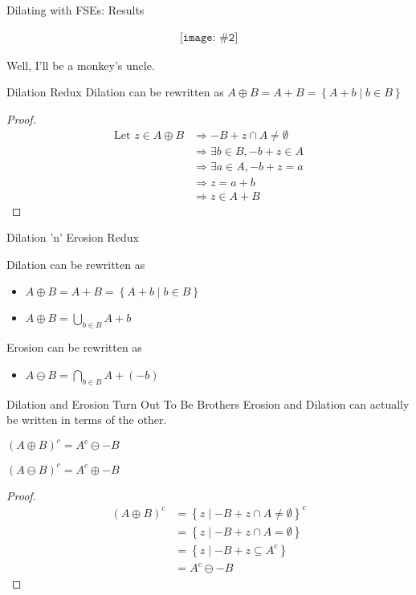 \documentclass{beamer}
\newcommand{\pic}[2]{
     \begin{array}{l}
      \texttt{[image: \#2]}
      \end{array}
}
\newcommand{\set}[1]{\left\lbrace #1 \right\rbrace}
\newcommand{\buildset}[2]{\set{#1 \mid #2}}
\newcommand{\intersect}{\cap}
\newcommand{\bigintersect}[1]{\displaystyle\bigcap_{#1}}
\newcommand{\bigunion}[1]{\displaystyle\bigcup_{#1}}
\newcommand{\imply}{\Rightarrow}
\newcommand{\dilate}{\oplus}
\newcommand{\erode}{\ominus}
\begin{document}
\begin{frame}{Dilating with FSEs: Results}

$$\pic{width=50pt}{./images/coolhamblen_translated.png}$$

Well, I'll be a monkey's uncle.

\end{frame}

\begin{frame}{Dilation Redux}
  Dilation can be rewritten as
  $A \dilate B = A + B = \buildset{A + b}{b \in B}$  
  \begin{proof}
    \begin{align*}
        \text{Let } z \in A \dilate B
      &\imply -B + z \intersect A \not= \emptyset
    \\&\imply \exists b \in B, -b + z \in A
    \\&\imply \exists a \in A, -b + z = a
    \\&\imply z = a+b
    \\&\imply z \in A+B
    \end{align*}
  \end{proof}
\end{frame}
\begin{frame}{Dilation 'n' Erosion Redux}

  Dilation can be rewritten as
  \begin{itemize}
    \item $A \dilate B = A + B = \buildset{A + b}{b \in B}$
    \item $A \dilate B = \bigunion{b \in B}A + b$
  \end{itemize}

  Erosion can be rewritten as
  \begin{itemize}
    \item $A \erode B = \bigintersect{b \in B}A + (-b)$
  \end{itemize}
  
\end{frame}

\begin{frame}{Dilation and Erosion Turn Out To Be Brothers}
  Erosion and Dilation can actually be written in terms of the other.

  $(A \dilate B)^c = A^c \erode -B$

  $(A \erode B)^c = A^c \dilate -B$

  \begin{proof}
    \begin{align*}
        (A \dilate B)^c
      &=\buildset{z}{-B+z \intersect A \not= \emptyset}^c
    \\&=\buildset{z}{-B+z \intersect A = \emptyset}
    \\&=\buildset{z}{-B+z \subseteq A^c}
    \\&=A^c \erode -B
    \end{align*}
  \end{proof}
\end{frame}
\end{document}
